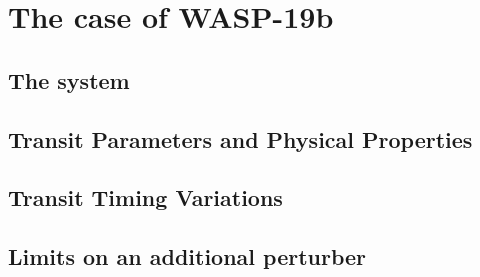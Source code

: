 \chapter{The case of WASP-19b}\label{chap:wasp19}

\section{The system}

\section{Transit Parameters and Physical Properties}

\section{Transit Timing Variations}

\section{Limits on an additional perturber}
